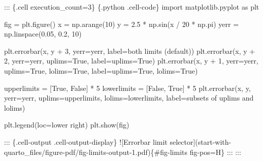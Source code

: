 \documentclass[
  letterpaper,
  DIV=11,
  numbers=noendperiod,
  oneside]{scrartcl}
\newenvironment{Shaded}{\begin{snugshade}}{\end{snugshade}}
\newcommand{\AlertTok}[1]{\textcolor[rgb]{0.68,0.00,0.00}{#1}}
\newcommand{\DecValTok}[1]{\textcolor[rgb]{0.68,0.00,0.00}{#1}}
\newcommand{\FloatTok}[1]{\textcolor[rgb]{0.68,0.00,0.00}{#1}}
\newcommand{\ImportTok}[1]{\textcolor[rgb]{0.00,0.46,0.62}{#1}}
\newcommand{\InformationTok}[1]{\textcolor[rgb]{0.37,0.37,0.37}{#1}}
\newcommand{\NormalTok}[1]{\textcolor[rgb]{0.00,0.23,0.31}{#1}}
\newcommand{\OperatorTok}[1]{\textcolor[rgb]{0.37,0.37,0.37}{#1}}
\newcommand{\StringTok}[1]{\textcolor[rgb]{0.13,0.47,0.30}{#1}}
\newcommand{\VariableTok}[1]{\textcolor[rgb]{0.07,0.07,0.07}{#1}}
\begin{document}
\begin{Shaded}
\begin{Highlighting}[]

\NormalTok{::: \{.cell execution\_count=3\}}
\InformationTok{\textasciigrave{}\textasciigrave{}\textasciigrave{} \{.python .cell{-}code\}}
\ImportTok{import}\NormalTok{ matplotlib.pyplot }\ImportTok{as}\NormalTok{ plt}

\NormalTok{fig }\OperatorTok{=}\NormalTok{ plt.figure()}
\NormalTok{x }\OperatorTok{=}\NormalTok{ np.arange(}\DecValTok{10}\NormalTok{)}
\NormalTok{y }\OperatorTok{=} \FloatTok{2.5} \OperatorTok{*}\NormalTok{ np.sin(x }\OperatorTok{/} \DecValTok{20} \OperatorTok{*}\NormalTok{ np.pi)}
\NormalTok{yerr }\OperatorTok{=}\NormalTok{ np.linspace(}\FloatTok{0.05}\NormalTok{, }\FloatTok{0.2}\NormalTok{, }\DecValTok{10}\NormalTok{)}

\NormalTok{plt.errorbar(x, y }\OperatorTok{+} \DecValTok{3}\NormalTok{, yerr}\OperatorTok{=}\NormalTok{yerr, label}\OperatorTok{=}\StringTok{\textquotesingle{}both limits (default)\textquotesingle{}}\NormalTok{)}
\NormalTok{plt.errorbar(x, y }\OperatorTok{+} \DecValTok{2}\NormalTok{, yerr}\OperatorTok{=}\NormalTok{yerr, uplims}\OperatorTok{=}\VariableTok{True}\NormalTok{, label}\OperatorTok{=}\StringTok{\textquotesingle{}uplims=True\textquotesingle{}}\NormalTok{)}
\NormalTok{plt.errorbar(x, y }\OperatorTok{+} \DecValTok{1}\NormalTok{, yerr}\OperatorTok{=}\NormalTok{yerr, uplims}\OperatorTok{=}\VariableTok{True}\NormalTok{, lolims}\OperatorTok{=}\VariableTok{True}\NormalTok{,}
\NormalTok{             label}\OperatorTok{=}\StringTok{\textquotesingle{}uplims=True, lolims=True\textquotesingle{}}\NormalTok{)}

\NormalTok{upperlimits }\OperatorTok{=}\NormalTok{ [}\VariableTok{True}\NormalTok{, }\VariableTok{False}\NormalTok{] }\OperatorTok{*} \DecValTok{5}
\NormalTok{lowerlimits }\OperatorTok{=}\NormalTok{ [}\VariableTok{False}\NormalTok{, }\VariableTok{True}\NormalTok{] }\OperatorTok{*} \DecValTok{5}
\NormalTok{plt.errorbar(x, y, yerr}\OperatorTok{=}\NormalTok{yerr, uplims}\OperatorTok{=}\NormalTok{upperlimits, lolims}\OperatorTok{=}\NormalTok{lowerlimits,}
\NormalTok{             label}\OperatorTok{=}\StringTok{\textquotesingle{}subsets of uplims and lolims\textquotesingle{}}\NormalTok{)}

\NormalTok{plt.legend(loc}\OperatorTok{=}\StringTok{\textquotesingle{}lower right\textquotesingle{}}\NormalTok{)}
\NormalTok{plt.show(fig)}
\InformationTok{\textasciigrave{}\textasciigrave{}\textasciigrave{}}

\NormalTok{::: \{.cell{-}output .cell{-}output{-}display\}}
\AlertTok{![Errorbar limit selector](start{-}with{-}quarto\_files/figure{-}pdf/fig{-}limits{-}output{-}1.pdf)}\NormalTok{\{\#fig{-}limits fig{-}pos=\textquotesingle{}H\textquotesingle{}\}}
\NormalTok{:::}
\NormalTok{:::}

\end{Highlighting}
\end{Shaded}
\end{document}
